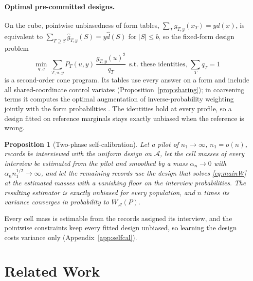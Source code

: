 \documentclass{article}
\newtheorem{proposition}[theorem]{Proposition}
\newcommand{\A}{\mathcal A}
\begin{document}
\paragraph{Optimal pre-committed designs.}
On the cube, pointwise unbiasedness of form tables, $\sum_Tg_{T,y}(x_T)=yd(x)$, is equivalent to $\sum_{T\supseteq S}\widehat g_{T,y}(S)=y\widehat d(S)$ for $|S|\le b$, so the fixed-form design problem
\begin{equation}
 \min_{q,g}\ \sum_{T,u,y}P_T(u,y)\,\frac{g_{T,y}(u)^2}{q_T}\ \ \text{s.t. these identities, }\textstyle\sum_Tq_T=1\label{eq:formprogram}
\end{equation}
is a second-order cone program. Its tables use every answer on a form and include all shared-coordinate control variates (Proposition~\ref{prop:sharing}); in coarsening terms it computes the optimal augmentation of inverse-probability weighting jointly with the form probabilities \citep{robins1994,tsiatis2006}. The identities hold at every profile, so a design fitted on reference marginals stays exactly unbiased when the reference is wrong.

\begin{proposition}[Two-phase self-calibration]\label{prop:selfcalmain}
Let a pilot of $n_1\to\infty$, $n_1=o(n)$, records be interviewed with the uniform design on $\A$, let the cell masses of every interview be estimated from the pilot and smoothed by a mass $\alpha_n\to0$ with $\alpha_n n_1^{1/2}\to\infty$, and let the remaining records use the design that solves \eqref{eq:mainW} at the estimated masses with a vanishing floor on the interview probabilities. The resulting estimator is exactly unbiased for every population, and $n$ times its variance converges in probability to $W_\A(P)$.
\end{proposition}
Every cell mass is estimable from the records assigned its interview, and the pointwise constraints keep every fitted design unbiased, so learning the design costs variance only (Appendix~\ref{app:selfcal}).




\section{Related Work}\label{sec:related}
\end{document}
